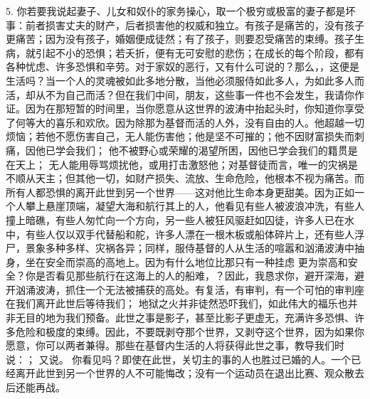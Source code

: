 5. 你若要我说起妻子、儿女和奴仆的家务操心，取一个极穷或极富的妻子都是坏事：前者损害丈夫的财产，后者损害他的权威和独立。有孩子是痛苦的，没有孩子更痛苦；因为没有孩子，婚姻便成徒然；有了孩子，则要忍受痛苦的束缚。孩子生病，就引起不小的恐惧；若夭折，便有无可安慰的悲伤；在成长的每个阶段，都有各种忧虑、许多恐惧和辛劳。对于家奴的恶行，又有什么可说的？那么，，这便是生活吗？当一个人的灵魂被如此多地分散，当他必须服侍如此多人，为如此多人而活，却从不为自己而活？但在我们中间，朋友，这些事一件也不会发生，我请你作证。因为在那短暂的时间里，当你愿意从这世界的波涛中抬起头时，你知道你享受了何等大的喜乐和欢欣。因为除那为基督而活的人外，没有自由的人。他超越一切烦恼；若他不愿伤害自己，无人能伤害他；他是坚不可摧的；他不因财富损失而刺痛，因他已学会我们； 他不被野心或荣耀的渴望所困，因他已学会我们的籍贯是在天上； 无人能用辱骂烦扰他，或用打击激怒他；对基督徒而言，唯一的灾祸是不顺从天主；但其他一切，如财产损失、流放、生命危险，他根本不视为痛苦。而所有人都恐惧的离开此世到另一个世界——这对他比生命本身更甜美。因为正如一个人攀上悬崖顶端，凝望大海和航行其上的人，他看见有些人被波浪冲洗，有些人撞上暗礁，有些人匆忙向一个方向，另一些人被狂风驱赶如囚徒，许多人已在水中，有些人仅以双手代替船和舵，许多人漂在一根木板或船体碎片上，还有些人浮尸，景象多种多样、灾祸各异；同样，服侍基督的人从生活的喧嚣和汹涌波涛中抽身，坐在安全而崇高的高地上。因为有什么地位比那只有一种挂虑 更为崇高和安全？你是否看见那些航行在这海上的人的船难，？因此，我恳求你，避开深海，避开汹涌波涛，抓住一个无法被捕获的高处。有复活，有审判，有一个可怕的审判座在我们离开此世后等待我们； 地狱之火并非徒然恐吓我们，如此伟大的福乐也并非无目的地为我们预备。此世之事是影子，甚至比影子更虚无，充满许多恐惧、许多危险和极度的束缚。因此，不要既剥夺那个世界，又剥夺这个世界，因为如果你愿意，你可以两者兼得。那些在基督内生活的人将获得此世之事，教导我们时说：； 又说。 你看见吗？即使在此世，关切主的事的人也胜过已婚的人。一个已经离开此世到另一个世界的人不可能悔改；没有一个运动员在退出比赛、观众散去后还能再战。\par

